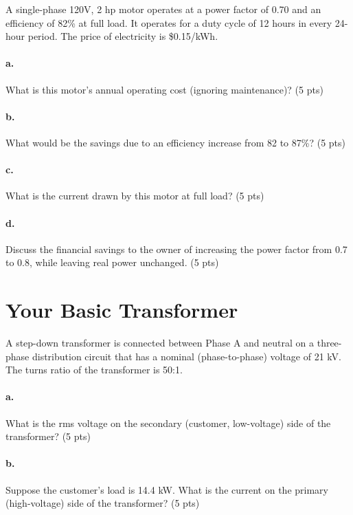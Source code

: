 \documentclass{article}
\begin{document}
A single-phase 120V, 2 hp motor operates at a power factor of 0.70 and
an efficiency of 82\% at full load.  It operates for a duty cycle of 12
hours in every 24-hour period.  The price of electricity is \$0.15/kWh.

\paragraph{a.} What is this motor's annual operating cost (ignoring maintenance)?
(5 pts)

\paragraph{b.} What would be the savings due to an efficiency increase from 82 to
87\%? (5 pts)

\paragraph{c.} What is the current drawn by this motor at full load? (5 pts)

\paragraph{d.} Discuss the financial savings to the owner of increasing the power
factor from 0.7 to 0.8, while leaving real power unchanged. (5 pts)

\newpage
\section{Your Basic Transformer}

A step-down transformer is connected between Phase A and neutral on a
three-phase distribution circuit that has a nominal (phase-to-phase)
voltage of 21 kV.  The turns ratio of the transformer is 50:1.

\paragraph{a.} What is the rms voltage on the secondary (customer, low-voltage)
side of the transformer? (5 pts)

\paragraph{b.} Suppose the customer's load is 14.4 kW.  What is the current on the
primary (high-voltage) side of the transformer? (5 pts)
\end{document}
